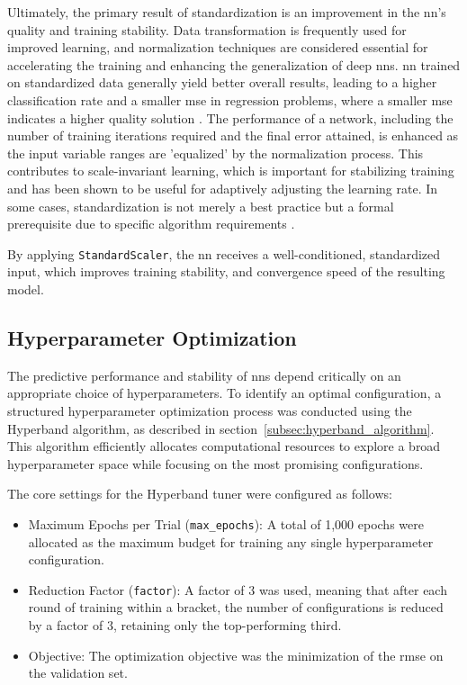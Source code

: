 Ultimately, the primary result of standardization is an improvement in the \ac{nn}'s quality and training stability. Data transformation is frequently used for improved learning, and normalization techniques are considered essential for accelerating the training and enhancing the generalization of deep \ac{nn}s. \ac{nn} trained on standardized data generally yield better overall results, leading to a higher classification rate and a smaller \ac{mse} in regression problems, where a smaller \ac{mse} indicates a higher quality solution \parencite{shanker1996effectdatastandardization}. The performance of a network, including the number of training iterations required and the final error attained, is enhanced as the input variable ranges are 'equalized' by the normalization process. This contributes to scale-invariant learning, which is important for stabilizing training and has been shown to be useful for adaptively adjusting the learning rate. In some cases, standardization is not merely a best practice but a formal prerequisite due to specific algorithm requirements \parencite{huang2020normalizationtechniquestrainingdnns}.

By applying \texttt{StandardScaler}, the \ac{nn} receives a well-conditioned, standardized input, which improves training stability, and convergence speed of the resulting model.

\subsection{Hyperparameter Optimization}
\label{subsec:hyperparameter_optimization}

The predictive performance and stability of \ac{nn}s depend critically on an appropriate choice of hyperparameters. To identify an optimal configuration, a structured hyperparameter optimization process was conducted using the Hyperband algorithm, as described in section~\ref{subsec:hyperband_algorithm}. This algorithm efficiently allocates computational resources to explore a broad hyperparameter space while focusing on the most promising configurations.

The core settings for the Hyperband tuner were configured as follows:
\begin{itemize}
	\item Maximum Epochs per Trial (\texttt{max\_epochs}): A total of 1,000 epochs were allocated as the maximum budget for training any single hyperparameter configuration.
	\item Reduction Factor (\texttt{factor}): A factor of 3 was used, meaning that after each round of training within a bracket, the number of configurations is reduced by a factor of 3, retaining only the top-performing third.
	\item Objective: The optimization objective was the minimization of the \ac{rmse} on the validation set.
\end{itemize}

